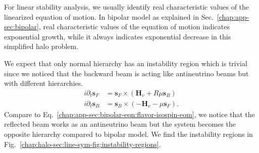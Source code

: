 For linear stability analysis, we usually identify real characteristic values of the linearized equation of motion. In bipolar model as explained in Sec.~\ref{chap:app-sec:bipolar}, real characteristic values of the equation of motion indicates exponential growth, while it always indicates exponential decrease in this simplified halo problem. 

We expect that only normal hierarchy has an instability region which is trivial since we noticed that the backward beam is acting like antineutrino beams but with different hierarchies.
\begin{align}
 i \partial_t \mathbf s_F &= \mathbf s_F \times (\mathbf {H}_v +R \mu \mathbf s_B) \\
   i\partial_t \mathbf s_B &= \mathbf s_B \times (- \mathbf H_v - \mu \mathbf s_F) .
\end{align}
Compare to Eq.~\ref{chap:app-sec:bipolar-eqn:flavor-isospin-eom}, we notice that 
the reflected beam works as an antineutrino beam but the system becomes the opposite hierarchy compared to bipolar model. We find the instability regions in Fig.~\ref{chap:halo-sec:line-sym-fig:instability-regions}.


